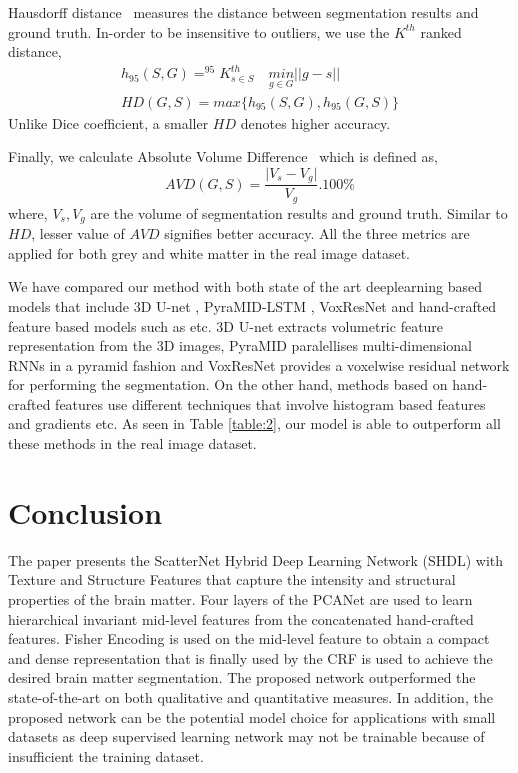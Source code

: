 \documentclass[10pt,twocolumn,letterpaper]{article}
\begin{document}
Hausdorff distance~\cite{cciccek20163d} measures the distance between segmentation results and ground truth. In-order to be insensitive to outliers, we use the $K^{th}$ ranked distance, 
\begin{gather}
h_{95}(S, G) =    ^{95}K_{s \in S}^{th} \quad \underset{g \in G}{min} \vert \vert g - s \vert \vert \\
HD(G,S)= max\{ h_{95}(S, G), h_{95}(G, S) \}
\end{gather}  
Unlike Dice coefficient,  a smaller $HD$ denotes higher accuracy. 

Finally, we calculate Absolute Volume Difference~\cite{cciccek20163d} which is defined as, 
\begin{equation}
AVD(G,S)=\frac{\vert V_s - V_g \vert }{V_g}. 100\%
\end{equation} 
where, $V_s, V_g$ are the  volume of segmentation results and ground truth. Similar to $HD$, lesser value of $AVD$ signifies better accuracy.
All the three metrics are applied for both grey and white matter in the real image dataset. 


We have compared our method with both state of the art deeplearning based models that include 3D U-net \cite{cciccek20163d}, PyraMID-LSTM \cite{stollenga2015parallel}, VoxResNet \cite{chen2016voxresnet} and hand-crafted feature based models such as \cite{mahbod2016structural, pereira2016automatic} etc. 3D U-net extracts volumetric feature representation from the 3D images, PyraMID paralellises multi-dimensional RNNs in a pyramid fashion and VoxResNet provides a voxelwise residual network for performing the segmentation. On the other hand, methods based on hand-crafted features use different techniques that involve histogram based features \cite{mahbod2016structural} and gradients \cite{pereira2016automatic} etc. As seen in Table \ref{table:2}, our model is able to outperform all these methods in the real image dataset.   

           
\section{Conclusion}
The paper presents the ScatterNet Hybrid Deep Learning Network (SHDL) with Texture and Structure Features that capture the intensity and structural properties of the brain matter. Four layers of the PCANet are used to learn hierarchical invariant mid-level features from the concatenated hand-crafted features. Fisher Encoding is used on the mid-level feature to obtain a compact and dense representation that is finally used by the CRF is used to achieve the desired brain matter segmentation. The proposed network outperformed the state-of-the-art on both qualitative and quantitative measures. In addition, the proposed network can be the potential model choice for applications with small datasets as deep supervised learning network may not be trainable because of insufficient the training dataset. 
{\small


}
\end{document}
